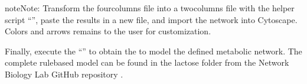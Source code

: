 \documentclass[letterpaper,10pt,english]{sphinxmanual}
\begin{document}
\begin{sphinxadmonition}{note}{Note:}
 Transform the four\sphinxhyphen{}columns file into a
two\sphinxhyphen{}columns file with the helper script “”, paste
the results in a new file, and import the network into Cytoscape. Colors and
arrows remains to the user for customization.

\noindent{}
\end{sphinxadmonition}

Finally, execute the “” to obtain the
 to model the defined metabolic network. The complete rule\sphinxhyphen{}based
model can be found in the lactose folder from the Network Biology Lab
GitHub repository .
\end{document}
